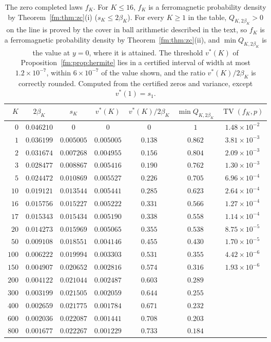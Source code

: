 \begin{table}[htbp]
\centering\small
\begin{tabular}{@{}rcccccc@{}}
\toprule
$K$ & $2\beta_K$ & $s_K$ & $v^*(K)$ & $v^*(K)/2\beta_K$ & $\min Q_{K,2\beta_K}$ & $\operatorname{TV}(f_K,p)$\\
\midrule
$0$ & $0.046210$ & $0$ & $0$ & $0$ & $1$ & $1.48\times10^{-2}$\\
$1$ & $0.036199$ & $0.005005$ & $0.005005$ & $0.138$ & $0.862$ & $3.81\times10^{-3}$\\
$2$ & $0.031674$ & $0.007268$ & $0.004955$ & $0.156$ & $0.804$ & $2.09\times10^{-3}$\\
$3$ & $0.028477$ & $0.008867$ & $0.005416$ & $0.190$ & $0.762$ & $1.30\times10^{-3}$\\
$5$ & $0.024472$ & $0.010869$ & $0.005527$ & $0.226$ & $0.705$ & $6.96\times10^{-4}$\\
$10$ & $0.019121$ & $0.013544$ & $0.005441$ & $0.285$ & $0.623$ & $2.64\times10^{-4}$\\
$16$ & $0.015756$ & $0.015227$ & $0.005222$ & $0.331$ & $0.566$ & $1.27\times10^{-4}$\\
$17$ & $0.015343$ & $0.015434$ & $0.005190$ & $0.338$ & $0.558$ & $1.14\times10^{-4}$\\
$20$ & $0.014273$ & $0.015969$ & $0.005065$ & $0.355$ & $0.538$ & $8.75\times10^{-5}$\\
$50$ & $0.009108$ & $0.018551$ & $0.004146$ & $0.455$ & $0.430$ & $1.70\times10^{-5}$\\
$100$ & $0.006222$ & $0.019994$ & $0.003303$ & $0.531$ & $0.355$ & $4.42\times10^{-6}$\\
$150$ & $0.004907$ & $0.020652$ & $0.002816$ & $0.574$ & $0.316$ & $1.93\times10^{-6}$\\
$200$ & $0.004122$ & $0.021044$ & $0.002487$ & $0.603$ & $0.289$ & \\
$300$ & $0.003199$ & $0.021505$ & $0.002059$ & $0.644$ & $0.255$ & \\
$400$ & $0.002659$ & $0.021775$ & $0.001784$ & $0.671$ & $0.232$ & \\
$600$ & $0.002036$ & $0.022087$ & $0.001441$ & $0.708$ & $0.203$ & \\
$800$ & $0.001677$ & $0.022267$ & $0.001229$ & $0.733$ & $0.184$ & \\
\bottomrule
\end{tabular}
\caption{The zero completed laws $f_K$. For $K\le16$, $f_K$ is a ferromagnetic probability density by Theorem~\ref{fm:thm:zc}(i) ($s_K\le2\beta_K$). For every $K\ge1$ in the table, $Q_{K,2\beta_K}>0$ on the line is proved by the cover in ball arithmetic described in the text, so $f_K$ is a ferromagnetic probability density by Theorem~\ref{fm:thm:zc}(ii), and $\min Q_{K,2\beta_K}$ is the value at $y=0$, where it is attained. The threshold $v^*(K)$ of Proposition~\ref{fm:prop:hermite} lies in a certified interval of width at most $1.2\times10^{-7}$, within $6\times10^{-7}$ of the value shown, and the ratio $v^*(K)/2\beta_K$ is correctly rounded. Computed from the certified zeros and variance, except $v^*(1)=s_1$.}
\label{fm:tab:fK}
\end{table}

